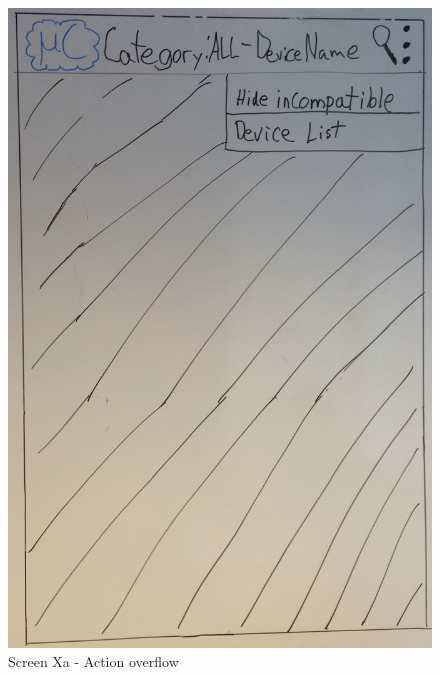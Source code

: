 \begin{figure}[H]
\centering
\includegraphics[scale=0.2]{images/Design_guide/ScreenXa.png}
\caption{Screen Xa - Action overflow}
\end{figure}
